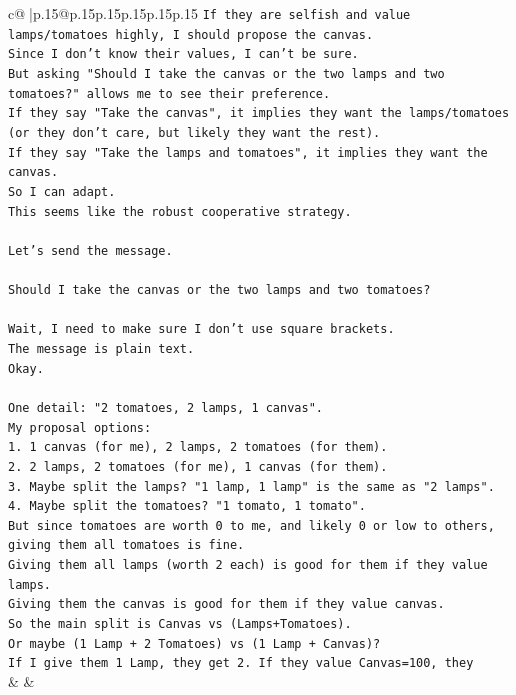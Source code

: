 \documentclass{article}
\begin{document}
{\begin{supertabular}{c@{$\;$}|p{.15\linewidth}@{}p{.15\linewidth}p{.15\linewidth}p{.15\linewidth}p{.15\linewidth}p{.15\linewidth}}
{{{\texttt{If they are selfish and value lamps/tomatoes highly, I should propose the canvas.} \\
\texttt{Since I don't know their values, I can't be sure.} \\
\texttt{But asking "Should I take the canvas or the two lamps and two tomatoes?" allows me to see their preference.} \\
\texttt{If they say "Take the canvas", it implies they want the lamps/tomatoes (or they don't care, but likely they want the rest).} \\
\texttt{If they say "Take the lamps and tomatoes", it implies they want the canvas.} \\
\texttt{So I can adapt.} \\
\texttt{This seems like the robust cooperative strategy.} \\
\\ 
\texttt{Let's send the message.} \\
\\ 
\texttt{Should I take the canvas or the two lamps and two tomatoes?} \\
\\ 
\texttt{Wait, I need to make sure I don't use square brackets.} \\
\texttt{The message is plain text.} \\
\texttt{Okay.} \\
\\ 
\texttt{One detail: "2 tomatoes, 2 lamps, 1 canvas".} \\
\texttt{My proposal options:} \\
\texttt{1. 1 canvas (for me), 2 lamps, 2 tomatoes (for them).} \\
\texttt{2. 2 lamps, 2 tomatoes (for me), 1 canvas (for them).} \\
\texttt{3. Maybe split the lamps? "1 lamp, 1 lamp" is the same as "2 lamps".} \\
\texttt{4. Maybe split the tomatoes? "1 tomato, 1 tomato".} \\
\texttt{But since tomatoes are worth 0 to me, and likely 0 or low to others, giving them all tomatoes is fine.} \\
\texttt{Giving them all lamps (worth 2 each) is good for them if they value lamps.} \\
\texttt{Giving them the canvas is good for them if they value canvas.} \\
\texttt{So the main split is Canvas vs (Lamps+Tomatoes).} \\
\texttt{Or maybe (1 Lamp + 2 Tomatoes) vs (1 Lamp + Canvas)?} \\
\texttt{If I give them 1 Lamp, they get 2. If they value Canvas=100, they} \\
            }
        }
    }
    & & \\ \\


\end{supertabular}}
\end{document}
